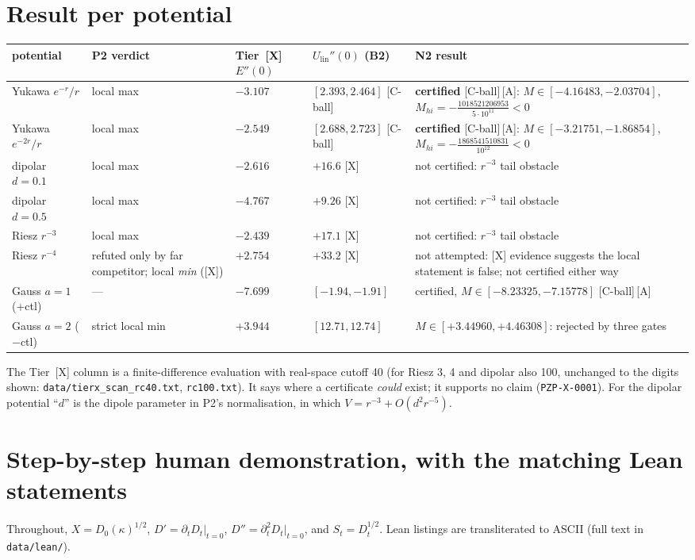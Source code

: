 \documentclass[10pt]{article}
\newcommand{\tier}[1]{\textsf{[#1]}}
\newcommand{\tA}{\tier{A}}
\newcommand{\tX}{\tier{X}}
\newcommand{\tCb}{\textcolor{blue!60!black}{\textsf{[C-ball]}}}
\newcommand{\Ulin}{U_{\mathrm{lin}}}
\begin{document}
\section{Result per potential}\label{sec:table}
\begin{center}\small\setlength{\tabcolsep}{4pt}\begin{tabular}{p{2.6cm}p{1.6cm}p{2.3cm}p{1.9cm}p{5.6cm}}\toprule
potential & P2 verdict & Tier~\tX{} $E''(0)$ & $\Ulin''(0)$ (B2) & N2 result\\\midrule
Yukawa $e^{-r}/r$ & local max & $-3.107$ & $[2.393,2.464]$ \tCb & \textbf{certified} \tCb\,\tA: $M\in[-4.16483,-2.03704]$, $M_{hi}=-\tfrac{1018521206953}{5\cdot10^{11}}<0$\\
Yukawa $e^{-2r}/r$ & local max & $-2.549$ & $[2.688,2.723]$ \tCb & \textbf{certified} \tCb\,\tA: $M\in[-3.21751,-1.86854]$, $M_{hi}=-\tfrac{1868541510831}{10^{12}}<0$\\
dipolar $d=0.1$ & local max & $-2.616$ & $+16.6$ \tX & not certified: $r^{-3}$ tail obstacle\\
dipolar $d=0.5$ & local max & $-4.767$ & $+9.26$ \tX & not certified: $r^{-3}$ tail obstacle\\
Riesz $r^{-3}$ & local max & $-2.439$ & $+17.1$ \tX & not certified: $r^{-3}$ tail obstacle\\
Riesz $r^{-4}$ & refuted only by far competitor; local \emph{min} (\tX) & $+2.754$ & $+33.2$ \tX & not attempted: \tX{} evidence suggests the local statement is false; not certified either way\\
\midrule
Gauss $a=1$ (+ctl) & --- & $-7.699$ & $[-1.94,-1.91]$ & certified, $M\in[-8.23325,-7.15778]$ \tCb\,\tA\\
Gauss $a=2$ ($-$ctl) & strict local min & $+3.944$ & $[12.71,12.74]$ & $M\in[+3.44960,+4.46308]$: rejected by three gates\\
\bottomrule\end{tabular}\end{center}
The Tier~\tX{} column is a finite-difference evaluation with real-space cutoff 40 (for Riesz 3, 4 and dipolar also 100, unchanged to the digits shown: \texttt{data/tierx\_scan\_rc40.txt}, \texttt{rc100.txt}). It says where a certificate \emph{could} exist; it supports no claim (\texttt{PZP-X-0001}). For the dipolar potential ``$d$'' is the dipole parameter in P2's normalisation, in which $V=r^{-3}+O(d^2r^{-5})$.

\section{Step-by-step human demonstration, with the matching Lean statements}\label{sec:human}
Throughout, $X=D_0(\kappa)^{1/2}$, $D'=\partial_tD_t|_{t=0}$, $D''=\partial_t^2D_t|_{t=0}$, and $S_t=D_t^{1/2}$. Lean listings are transliterated to ASCII (full text in \texttt{data/lean/}).
\end{document}
